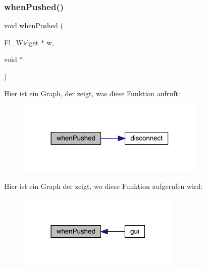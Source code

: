 \subsubsection{when\+Pushed()}
{\footnotesize\ttfamily void when\+Pushed (\begin{DoxyParamCaption}\item[{Fl\+\_\+\+Widget $\ast$}]{w,  }\item[{void $\ast$}]{ }\end{DoxyParamCaption})}

Hier ist ein Graph, der zeigt, was diese Funktion aufruft\+:\nopagebreak
\begin{figure}[H]
\begin{center}
\leavevmode
\includegraphics[width=254pt]{gui_8hpp_aa0976691d9932853389991b8459ebd85_cgraph}
\end{center}
\end{figure}
Hier ist ein Graph der zeigt, wo diese Funktion aufgerufen wird\+:\nopagebreak
\begin{figure}[H]
\begin{center}
\leavevmode
\includegraphics[width=219pt]{gui_8hpp_aa0976691d9932853389991b8459ebd85_icgraph}
\end{center}
\end{figure}
